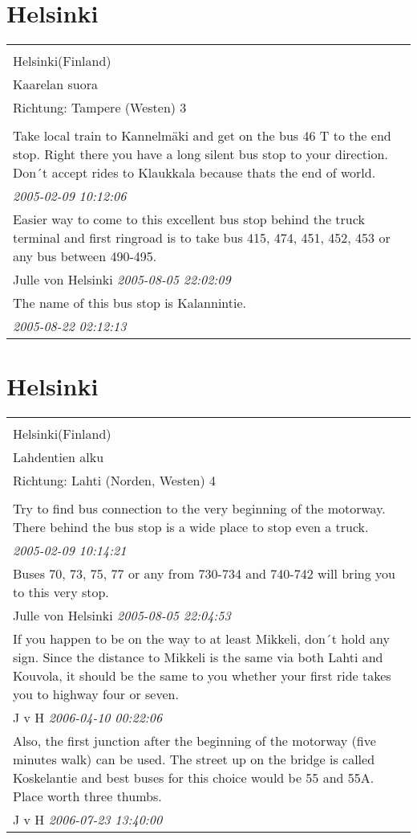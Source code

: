\documentclass[a4paper,12pt]{article}
\begin{document}
\section{Helsinki}
\begin{tabular}{|p{13cm}|}
\hline\\
Helsinki(Finland)\\
Kaarelan suora\\
Richtung: Tampere (Westen) 3 \\
\hline\\
Take local train to Kannelmäki and get on the bus 46 T to the end stop. Right there you have a long silent bus stop to your direction. Don´t accept rides to Klaukkala because thats the end of world. \\
\textit{ 2005-02-09 10:12:06 }\\\hline Easier way to come to this excellent bus stop behind the truck terminal and first ringroad is to take bus 415, 474, 451, 452, 453 or any bus between 490-495. \\
Julle von Helsinki \textit{ 2005-08-05 22:02:09 }\\\hline The name of this bus stop is Kalannintie. \\
\textit{ 2005-08-22 02:12:13 }\\\hline
\end{tabular}


\section{Helsinki}
\begin{tabular}{|p{13cm}|}
\hline\\
Helsinki(Finland)\\
Lahdentien alku\\
Richtung: Lahti (Norden, Westen) 4 \\
\hline\\
Try to find bus connection to the very beginning of the motorway. There behind the bus stop is a wide place to stop even a truck. \\
\textit{ 2005-02-09 10:14:21 }\\\hline Buses 70, 73, 75, 77 or any from 730-734 and 740-742 will bring you to this very stop. \\
Julle von Helsinki \textit{ 2005-08-05 22:04:53 }\\\hline If you happen to be on the way to at least Mikkeli, don´t hold any sign. Since the distance to Mikkeli is the same via both Lahti and Kouvola, it should be the same to you whether your first ride takes you to highway four or seven. \\
J v H \textit{ 2006-04-10 00:22:06 }\\\hline Also, the first junction after the beginning of the motorway (five minutes walk) can be used. The street up on the bridge is called Koskelantie and best buses for this choice would be 55 and 55A. Place worth three thumbs. \\
J v H \textit{ 2006-07-23 13:40:00 }\\\hline
\end{tabular}
\end{document}
